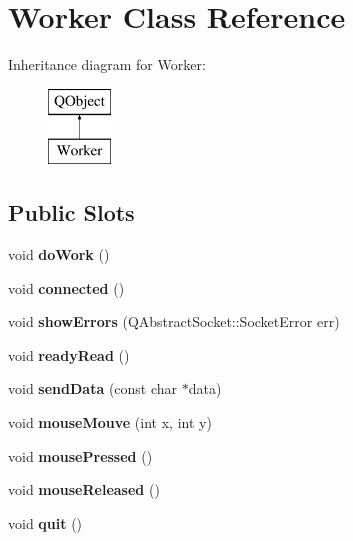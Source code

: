\hypertarget{classWorker}{}\section{Worker Class Reference}
\label{classWorker}
Inheritance diagram for Worker\+:\begin{figure}[H]
\begin{center}
\leavevmode
\includegraphics[height=2.000000cm]{classWorker}
\end{center}
\end{figure}
\subsection*{Public Slots}
\begin{DoxyCompactItemize}
\item 
\hypertarget{classWorker_a4c6b6f22801862ae967df319161af625}{}void {\bfseries do\+Work} ()\label{classWorker_a4c6b6f22801862ae967df319161af625}

\item 
\hypertarget{classWorker_a69f4fcd9c521325d9187bb7058ad464d}{}void {\bfseries connected} ()\label{classWorker_a69f4fcd9c521325d9187bb7058ad464d}

\item 
\hypertarget{classWorker_a58e6bc1addd640ab0296e684d81982a3}{}void {\bfseries show\+Errors} (Q\+Abstract\+Socket\+::\+Socket\+Error err)\label{classWorker_a58e6bc1addd640ab0296e684d81982a3}

\item 
\hypertarget{classWorker_a4988aee2e17996699656c117879e54c4}{}void {\bfseries ready\+Read} ()\label{classWorker_a4988aee2e17996699656c117879e54c4}

\item 
\hypertarget{classWorker_af34dd25646dc3c39f45cf73f79020279}{}void {\bfseries send\+Data} (const char $\ast$data)\label{classWorker_af34dd25646dc3c39f45cf73f79020279}

\item 
\hypertarget{classWorker_a6a87fdd0f6aae05ebf6c1abdd53f8497}{}void {\bfseries mouse\+Mouve} (int x, int y)\label{classWorker_a6a87fdd0f6aae05ebf6c1abdd53f8497}

\item 
\hypertarget{classWorker_a8818b69161fa650b94bc16d1f6c1294f}{}void {\bfseries mouse\+Pressed} ()\label{classWorker_a8818b69161fa650b94bc16d1f6c1294f}

\item 
\hypertarget{classWorker_ae8a158cb2b7be380f4116635431ef4f4}{}void {\bfseries mouse\+Released} ()\label{classWorker_ae8a158cb2b7be380f4116635431ef4f4}

\item 
\hypertarget{classWorker_ae07a9b0715949002bd63a41e1f7571d7}{}void {\bfseries quit} ()\label{classWorker_ae07a9b0715949002bd63a41e1f7571d7}

\end{DoxyCompactItemize}
